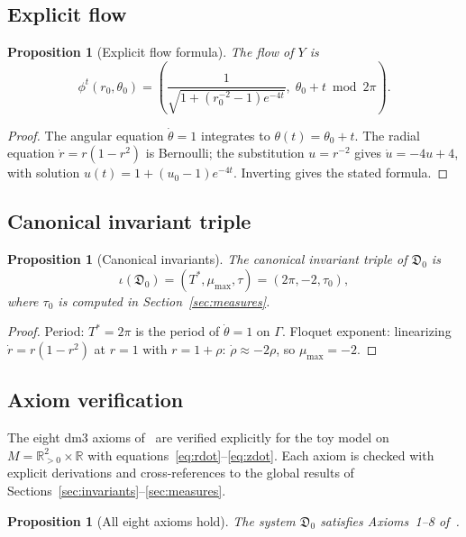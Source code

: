 \documentclass[12pt, oneside]{book}
\theoremstyle{plain}
\newtheorem{proposition}[theorem]{Proposition}
\theoremstyle{definition}
\theoremstyle{remark}
\newcommand{\R}{\mathbb{R}}
\newcommand{\dm}{\mathfrak{D}}
\newcommand{\Orb}{\Gamma}
\begin{document}
\subsection{Explicit flow}

\begin{proposition}[Explicit flow formula]\label{prop:flow}
The flow of $Y$ is
\[
  \phi^t(r_0,\theta_0) =
  \left(\frac{1}{\sqrt{1+(r_0^{-2}-1)e^{-4t}}},\;
  \theta_0 + t\bmod 2\pi\right).
\]
\end{proposition}
\begin{proof}
The angular equation $\dot\theta=1$ integrates to $\theta(t)=\theta_0+t$.
The radial equation $\dot r=r(1-r^2)$ is Bernoulli; the substitution
$u=r^{-2}$ gives $\dot u=-4u+4$, with solution
$u(t)=1+(u_0-1)e^{-4t}$. Inverting gives the stated formula.
\end{proof}

\subsection{Canonical invariant triple}

\begin{proposition}[Canonical invariants]\label{prop:canonical}
The canonical invariant triple of $\dm_0$ is
\[
  \iota(\dm_0) = (T^*,\mu_{\max},\tau) = (2\pi,-2,\tau_0),
\]
where $\tau_0$ is computed in Section~\ref{sec:measures}.
\end{proposition}
\begin{proof}
Period: $T^*=2\pi$ is the period of $\dot\theta=1$ on $\Orb$.
Floquet exponent: linearizing $\dot r=r(1-r^2)$ at $r=1$ with
$r=1+\rho$: $\dot\rho\approx-2\rho$, so $\mu_{\max}=-2$.
\end{proof}

\subsection{Axiom verification}\label{subsec:axioms}

The eight dm3 axioms of~\cite{Paper1} are verified explicitly
for the toy model on $M=\R^2_{>0}\times\R$ with
equations~\eqref{eq:rdot}--\eqref{eq:zdot}. Each axiom is checked
with explicit derivations and cross-references to the global results
of Sections~\ref{sec:invariants}--\ref{sec:measures}.

\begin{proposition}[All eight axioms hold]\label{prop:axioms}
The system $\dm_0$ satisfies Axioms~1--8 of~\cite{Paper1}.
\end{proposition}
\end{document}
